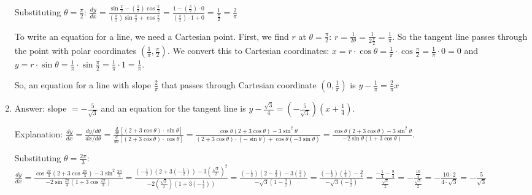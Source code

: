 \begin{Answer}[ref = polar3]
\begin{enumerate}
Substituting $\theta = \frac{\pi}{2}$: $\frac{dy}{dx} = \frac{\sin{\frac{\pi}{
2}} - \left( \frac{\pi}{2}\right) \cos{\frac{\pi}{2}}}{\left( \frac{\pi}{2} 
\right) \sin{\frac{\pi}{2}} + \cos{\frac{\pi}{2}}} = \frac{1 - \left( \frac{
\pi}{2} \right) \cdot 0 }{\left( \frac{\pi}{2} \right) \cdot 1 + 0} = \frac{1}{
\frac{\pi}{2}} = \frac{2}{\pi}$

To write an equation for a line, we need a Cartesian point. First, we find $r$ 
at $\theta = \frac{\pi}{2}$: $r = \frac{1}{2\theta} = \frac{1}{2\frac{\pi}{2}} 
= \frac{1}{\pi}$. So the tangent line passes through the point with polar 
coordinates $\left( \frac{1}{\pi}, \frac{\pi}{2} \right)$. We convert this to 
Cartesian coordinates: $x = r \cdot \cos{\theta} = \frac{1}{\pi} \cdot \cos{
\frac{\pi}{2}} = \frac{1}{\pi} \cdot 0 = 0$ and $y = r \cdot \sin{\theta} = 
\frac{1}{\pi} \cdot \sin{\frac{\pi}{2}} = \frac{1}{\pi} \cdot 1 = \frac{1}{
\pi}$. 

So, an equation for a line with slope $\frac{2}{\pi}$ that passes through 
Cartesian coordinate $\left( 0, \frac{1}{\pi} \right)$ is $y - \frac{1}{\pi} = 
\frac{2}{\pi} x$

\item Answer: slope $= -\frac{5}{\sqrt{3}}$ and an equation for the tangent 
line is $y - \frac{\sqrt{3}}{4} = \left( -\frac{5}{\sqrt{3}} \right) \left( x 
+ \frac{1}{4} \right)$.

Explanation: $\frac{dy}{dx} = \frac{dy/d\theta}{dx/d\theta} = \frac{\frac{d}{d
\theta} \left[ \left( 2 + 3\cos{\theta}\right) \cdot \sin{\theta} \right]}{
\frac{d}{d\theta} \left[ \left( 2 + 3\cos{\theta} \right) \cdot \cos{\theta} 
\right]} = \frac{\cos{\theta} \left( 2 + 3\cos{\theta}\right) - 3\sin^2{\theta}
}{\left( 2 + 3\cos{\theta}\right) \cdot \left(-\sin{\theta} \right) + \cos{
\theta} \left( -3\sin{\theta} \right)} = \frac{\cos{\theta} \left( 2 + 3\cos{
\theta}\right) - 3\sin^2{\theta}}{-2\sin{\theta} \left( 1 + 3\cos{\theta} 
\right)}$. 

Substituting $\theta = \frac{2\pi}{3}$: $\frac{dy}{dx} = \frac{\cos{\frac{2\pi
}{3}} \left( 2 + 3\cos{\frac{2\pi}{3}}\right) - 3\sin^2{\frac{2\pi}{3}}}{-2
\sin{\frac{2\pi}{3}} \left( 1 + 3\cos{\frac{2\pi}{3}}\right)} = \frac{\left( 
-\frac{1}{2} \right) \left( 2 + 3\left( -\frac{1}{2} \right)\right) - 3\left( 
\frac{\sqrt{3}}{2} \right)^2}{-2\left( \frac{\sqrt{3}}{2} \right) \left( 1 + 3
\left( -\frac{1}{2} \right) \right)} = \frac{\left( -\frac{1}{2}\right) \left(2
- \frac{3}{2} \right) - 3\left( \frac{3}{4} \right)}{-\sqrt{3} \left( 1 - 
\frac{3}{2} \right)} = \frac{\left( -\frac{1}{2}\right) \left( \frac{1}{2}
\right) - \frac{9}{4}}{-\sqrt{3} \left( -\frac{1}{2}\right)} = \frac{-\frac{1}{
4} - \frac{9}{4}}{\frac{\sqrt{3}}{2}} = -\frac{\frac{10}{4}}{\frac{\sqrt{3}}{2
}} = -\frac{10 \cdot 2}{4 \cdot \sqrt{3}} = -\frac{5}{\sqrt{3}}$


\end{enumerate}
\end{Answer}
